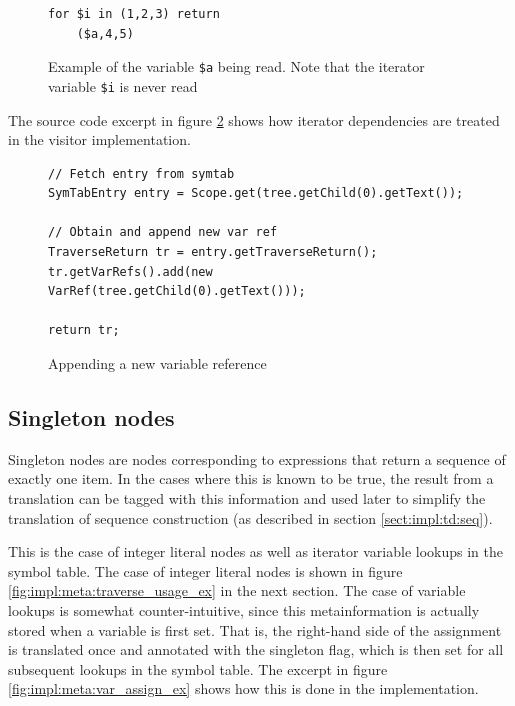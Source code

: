 \begin{figure}[!htp]
\begin{center}
\begin{minipage}[h]{5cm}
\begin{verbatim}
for $i in (1,2,3) return 
    ($a,4,5)
\end{verbatim}
\end{minipage}
  \caption{Example of the variable \texttt{\$a} being read. Note that the iterator
  variable \texttt{\$i} is never read}
  \label{fig:impl:meta:var_ref_ex}
\end{center}
\end{figure}

The source code excerpt in figure \ref{fig:impl:meta:var_ref_impl2} shows how
iterator dependencies are treated in the visitor implementation.

\begin{figure}[!htp]
\begin{center}
\begin{Verbatim}
// Fetch entry from symtab
SymTabEntry entry = Scope.get(tree.getChild(0).getText());
            
// Obtain and append new var ref
TraverseReturn tr = entry.getTraverseReturn();
tr.getVarRefs().add(new VarRef(tree.getChild(0).getText()));

return tr;
\end{Verbatim}
  \caption{Appending a new variable reference}
  \label{fig:impl:meta:var_ref_impl2}
\end{center}
\end{figure}

\subsection{Singleton nodes}
Singleton nodes are nodes corresponding to expressions that return a sequence of exactly one item. In
the cases where this is known to be true, the result from a translation can be
tagged with this information and used later to simplify the translation of
sequence construction (as described in section \ref{sect:impl:td:seq}).

This is the case of integer literal nodes as well as iterator variable lookups in the
symbol table. The case of integer literal nodes is shown in figure
\ref{fig:impl:meta:traverse_usage_ex} in the next section. The case of variable
lookups is somewhat counter-intuitive, since this metainformation is actually stored when a variable is first set. That is, the
right-hand side of the assignment is translated once and annotated with the singleton flag, which is
then set for all subsequent lookups in the symbol table. The excerpt in figure
\ref{fig:impl:meta:var_assign_ex} shows how this is done in the implementation.

